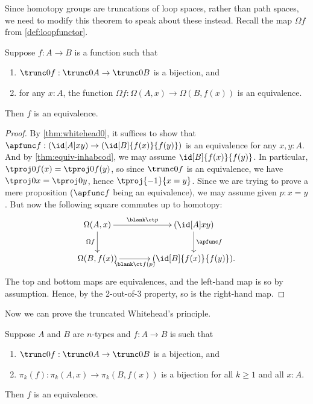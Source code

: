 {Since homotopy groups are truncations of loop spaces, rather than path spaces, we need to modify this theorem to speak about these instead. Recall the map $\Omega f$ from \cref{def:loopfunctor}.

\begin{cor}\label{thm:whitehead1}
  Suppose $f:A\to B$ is a function such that
  \begin{enumerate}
  \item $\trunc0 f : \trunc0 A \to \trunc0 B$ is a bijection, and
  \item for any $x:A$, the function $\Omega f : \Omega(A,x) \to \Omega(B,f(x))$ is an equivalence.
  \end{enumerate}
  Then $f$ is an equivalence.
\end{cor}
\begin{proof}
  By \cref{thm:whitehead0}, it suffices to show that $\apfunc f : (\id[A]xy) \to (\id[B]{f(x)}{f(y)})$ is an equivalence for any $x,y:A$.
  And by \cref{thm:equiv-inhabcod}, we may assume $\id[B]{f(x)}{f(y)}$.
  In particular, $\tproj0{f(x)} = \tproj0{f(y)}$, so since $\trunc0 f$ is an equivalence, we have $\tproj0 x = \tproj0y$, hence $\tproj{-1}{x=y}$.
  Since we are trying to prove a mere proposition ($\apfunc f$ being an equivalence), we may assume given $p:x=y$.
  But now the following square commutes up to homotopy:
  \begin{equation*}
  \vcenter{\xymatrix@C=3pc{
      \Omega(A,x)\ar[r]^-{\blank\ct p}\ar[d]_{\Omega f} &
      (\id[A]xy) \ar[d]^{\apfunc f}\\
      \Omega(B,f(x))\ar[r]_-{\blank\ct f(p)} &
      (\id[B]{f(x)}{f(y)}).
      }}
  \end{equation*}
  The top and bottom maps are equivalences, and the left-hand map is so by assumption.
  Hence, by the 2-out-of-3 property, so is the right-hand map.
\end{proof}

Now we can prove the truncated Whitehead's principle.

\begin{thm}\label{thm:whiteheadn}
  Suppose $A$ and $B$ are $n$-types and $f:A\to B$ is such that
  \begin{enumerate}
  \item $\trunc0f:\trunc0A \to \trunc0B$ is a bijection, and\label{item:wh0}
  \item $\pi_k(f):\pi_k(A,x) \to \pi_k(B,f(x))$ is a bijection for all $k\ge 1$ and all $x:A$.\label{item:whk}
  \end{enumerate}
  Then $f$ is an equivalence.
\end{thm}

}
